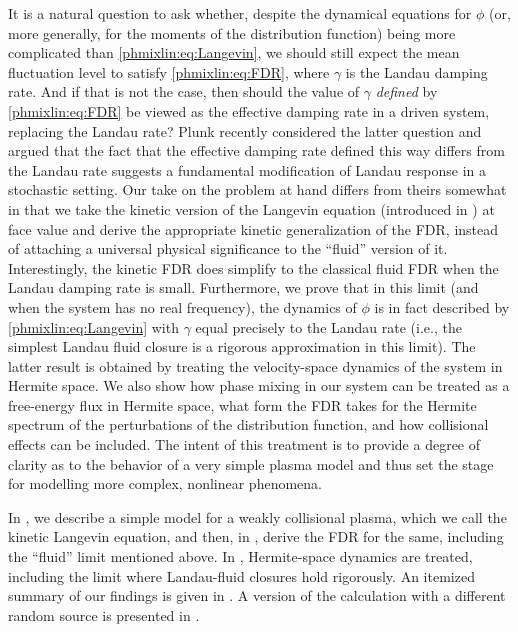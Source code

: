 It is a natural question to ask whether, despite the dynamical equations
for $\phi$ (or, more generally, for the moments of the distribution function) 
being more complicated than \eqref{phmixlin:eq:Langevin}, we should still expect the 
mean fluctuation level to satisfy \eqref{phmixlin:eq:FDR}, where $\gamma$ is 
the Landau damping rate. And if that is not the case, then should the value of 
$\gamma$ {\em defined} by \eqref{phmixlin:eq:FDR} be viewed as the 
effective damping rate in a driven system, replacing the Landau rate? 
Plunk \cite{plunk13} recently considered the latter question
and argued that the fact that the effective damping rate defined this way 
differs from the Landau rate suggests a fundamental modification of Landau response 
in a stochastic setting. Our take on the problem at hand differs 
from theirs somewhat in that we take the kinetic version of the Langevin 
equation (introduced in ) at face value and 
derive the appropriate kinetic generalization of the FDR, 
instead of attaching a universal physical significance to the ``fluid'' version of it. 
Interestingly, the kinetic FDR does simplify to the classical fluid FDR when 
the Landau damping rate is small. Furthermore, we prove that in this limit 
(and when the system has no real frequency), the dynamics of $\phi$ is in fact 
described by \eqref{phmixlin:eq:Langevin} 
with $\gamma$ equal precisely to the Landau rate (i.e., the simplest Landau fluid 
closure is a rigorous approximation in this limit). 
The latter result is obtained by treating the velocity-space dynamics 
of the system in Hermite space. We also show how phase mixing in our system can 
be treated as a free-energy flux in Hermite space, what form the FDR takes 
for the Hermite spectrum of the perturbations of the distribution function, 
and how collisional effects can be included. The intent of this treatment 
is to provide a degree of clarity as to the behavior of a very simple 
plasma model and thus set the stage for modelling more complex, nonlinear 
phenomena. 

In , 
we describe a simple model for a weakly collisional plasma, which we call the
kinetic Langevin equation, and then, in , derive the FDR for the same, 
including the ``fluid'' limit mentioned above. In , 
Hermite-space dynamics are treated, including the limit where 
Landau-fluid closures hold rigorously.  
An itemized summary of our findings is given in . A version of the
calculation with a different random source is presented in .

